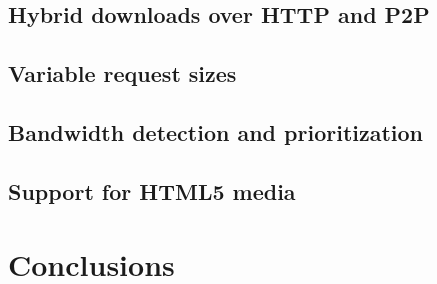 \documentclass[letterpaper,twocolumn,10pt]{article}
\begin{document}
\subsection{Hybrid downloads over HTTP and P2P}


\subsection{Variable request sizes}


\subsection{Bandwidth detection and prioritization}


\subsection{Support for HTML5 media}



\section{Conclusions}



{\footnotesize 
}
\end{document}
